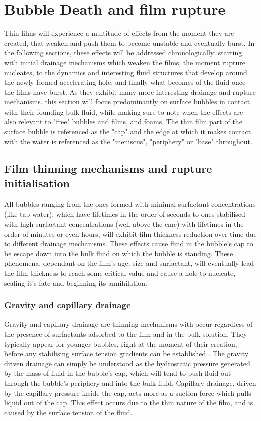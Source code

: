 \documentclass[a4paper,12pt]{article}
\numberwithin{equation}{section}
\numberwithin{figure}{section}
\numberwithin{table}{section}
\begin{document}
\section{Bubble Death and film rupture}
Thin films will experience a multitude of effects from the moment they are created, that weaken and push them to become unstable and eventually burst. In the following sections, these effects will be addressed chronologically: starting with initial drainage mechanisms which weaken the films, the moment rupture nucleates, to the dynamics and interesting fluid structures that develop around the newly formed accelerating hole, and finally what becomes of the fluid once the films have burst. As they exhibit many more interesting drainage and rupture mechanisms, this section will focus predominantly on surface bubbles in contact with their founding bulk fluid, while making sure to note when the effects are also relevant to "free" bubbles and films, and foams. The thin film part of the surface bubble is referenced as the "cap" and the edge at which it makes contact with the water is referenced as the "meniscus", "periphery" or "base" throughout.

\subsection{Film thinning mechanisms and rupture initialisation}
\label{sec:drainage}
All bubbles ranging from the ones formed with minimal surfactant concentrations (like tap water), which have lifetimes in the order of seconds \cite{Zheng1983, Lhuissier2011} to ones stabilised with high surfactant concentrations (well above the cmc) with lifetimes in the order of minutes or even hours, will exhibit film thickness reduction over time due to different drainage mechanisms. These effects cause fluid in the bubble's cap to be escape down into the bulk fluid on which the bubble is standing. These phenomena, dependant on the film's age, size and surfactant, will eventually lead the film thickness to reach some critical value and cause a hole to nucleate, sealing it's fate and beginning its annihilation.

\subsubsection{Gravity and capillary drainage}
\label{sec:GravNCap}
Gravity and capillary drainage are thinning mechanisms with occur regardless of the presence of surfactants adsorbed to the film and in the bulk solution. They typically appear for younger bubbles, right at the moment of their creation, before any stabilising surface tension gradients can be established \cite{Lhuissier2011}. The gravity driven drainage can simply be understood as the hydrostatic pressure generated by the mass of fluid in the bubble's cap, which will tend to push fluid out through the bubble's periphery and into the bulk fluid. Capillary drainage, driven by the capillary pressure inside the cap, acts more as a suction force which pulls liquid out of the cap. This effect occurs due to the thin nature of the film, and is caused by the surface tension of the fluid.
\end{document}

